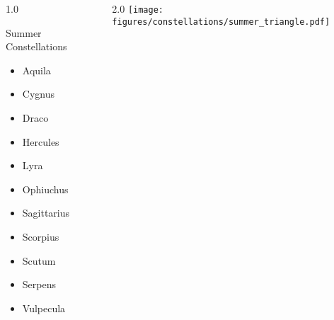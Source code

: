 \documentclass[final]{beamer}
\newlength{\colwidth}
\begin{document}
\begin{frame}[t]{}
    \begin{columns}[T]
        \begin{column}{1.0\colwidth}
            \Large
            \begin{block}{Summer Constellations}
                \begin{itemize}
                    \item{Aquila}
                    \item{Cygnus}
                    \item{Draco}
                    \item{Hercules}
                    \item{Lyra}
                    \item{Ophiuchus}
                    \item{Sagittarius}
                    \item{Scorpius}
                    \item{Scutum}
                    \item{Serpens}
                    \item{Vulpecula}
                \end{itemize}
            \end{block}
        \end{column}
        \begin{column}{2.0\colwidth}
            \centering
        \texttt{[image: figures/constellations/summer\_triangle.pdf]}      \end{column}
    \end{columns}
\end{frame}

\end{document}
